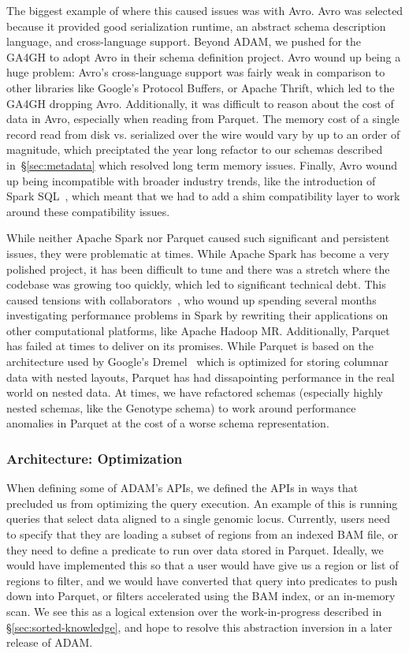 \documentclass[phd]{ucbthesis}
\begin{document}
The biggest example of where this caused issues was with Avro. Avro was selected
because it provided good serialization runtime, an abstract schema description
language, and cross-language support. Beyond ADAM, we pushed for the GA4GH
to adopt Avro in their schema definition project. Avro wound up being a huge
problem: Avro's cross-language support was fairly weak in comparison to other
libraries like Google's Protocol Buffers, or Apache Thrift, which led to the
GA4GH dropping Avro. Additionally, it was difficult to reason about the cost
of data in Avro, especially when reading from Parquet. The memory cost of a
single record read from disk vs. serialized over the wire would vary by up to an
order of magnitude, which preciptated the year long refactor to our schemas
described in~\S\ref{sec:metadata} which resolved long term memory issues.
Finally, Avro wound up being incompatible with broader industry trends, like
the introduction of Spark SQL~\cite{armbrust15}, which meant that we had to add
a shim compatibility layer to work around these compatibility issues.

While neither Apache Spark nor Parquet caused such significant and persistent
issues, they were problematic at times. While Apache Spark has become a very
polished project, it has been difficult to tune and there was a stretch where
the codebase was growing too quickly, which led to significant technical debt.
This caused tensions with collaborators~\cite{rubinsteyn14}, who wound up
spending several months investigating performance problems in Spark by rewriting
their applications on other computational platforms, like Apache Hadoop MR.
Additionally, Parquet has failed at times to deliver on its promises. While
Parquet is based on the architecture used by Google's Dremel~\cite{melnik10}
which is optimized for storing columnar data with nested layouts, Parquet has
had dissapointing performance in the real world on nested data. At times, we
have refactored schemas (especially highly nested schemas, like the Genotype
schema) to work around performance anomalies in Parquet at the cost of a worse
schema representation.

\subsubsection{Architecture: Optimization}
\label{sec:fail-optimization}

When defining some of ADAM's APIs, we defined the APIs in ways that precluded us
from optimizing the query execution. An example of this is running queries that
select data aligned to a single genomic locus. Currently, users need to specify
that they are loading a subset of regions from an indexed BAM file, or they need
to define a predicate to run over data stored in Parquet. Ideally, we would have
implemented this so that a user would have give us a region or list of regions
to filter, and we would have converted that query into predicates to push down
into Parquet, or filters accelerated using the BAM index, or an in-memory scan.
We see this as a logical extension over the work-in-progress described in
\S\ref{sec:sorted-knowledge}, and hope to resolve this abstraction inversion in
a later release of ADAM.
\end{document}
